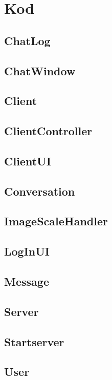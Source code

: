\documentclass[a4paper,11pt]{article}
\begin{document}
\section{Kod}
\subsection{ChatLog}

\subsection{ChatWindow}

\subsection{Client}

\subsection{ClientController}

\subsection{ClientUI}

\subsection{Conversation}

\subsection{ImageScaleHandler}

\subsection{LogInUI}

\subsection{Message}

\subsection{Server}

\subsection{Startserver}

\subsection{User}


	
\end{document}
